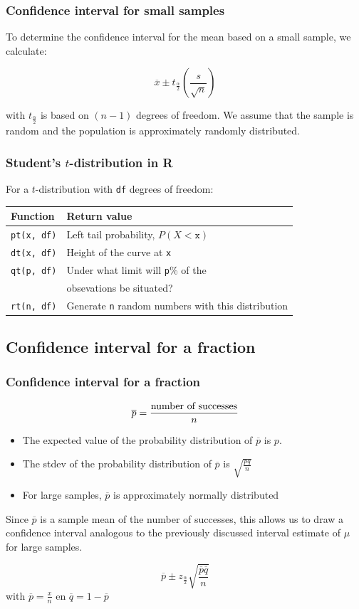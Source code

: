 \documentclass{beamer}
\begin{document}
\begin{frame}
  \frametitle{Confidence interval for small samples}

  To determine the confidence interval for the mean based on a small sample, we calculate:

  \[ \overline{x} \pm t_{\frac{\alpha}{2}}(\frac{s}{\sqrt{n}}) \]

  with $t_{\frac{\alpha}{2}}$ is based on $(n-1)$ degrees of freedom. We assume that the sample is random and the population is approximately randomly distributed.
\end{frame}


\begin{frame}[fragile]
\frametitle{Student's $t$-distribution in R}

For a $t$-distribution with \texttt{df} degrees of freedom:
\vfill
\centering
\begin{tabular}{ll}
	\textbf{Function} & \textbf{Return value}                                    \\ \hline
	\verb|pt(x, df)| & Left tail probability, $P(X<\mathtt{x})$                  \\
	\verb|dt(x, df)| & Height of the curve at \texttt{x}                     \\
	\verb|qt(p, df)| & Under what limit will \texttt{p}\% of the     \\
	                 & obsevations be situated?                             \\
	\verb|rt(n, df)| & Generate \texttt{n} random numbers with this distribution
\end{tabular}

\end{frame}

\subsection{Confidence interval for a fraction}
\begin{frame}
  \frametitle{Confidence interval for a fraction}
  \[ \overline{p} = \frac{\textnormal{number of successes}}{n} \]
  \begin{itemize}
  \item The expected value of the probability distribution of $\overline{p}$ is $p$.
  \item The stdev of the probability distribution of  $\overline{p}$ is $\sqrt{\frac{pq}{n}}$
  \item For large samples, $\overline{p}$ is approximately normally distributed
\end{itemize}

Since $\overline{p}$ is a sample mean of the number of successes, this allows us to draw a confidence interval analogous to the previously discussed interval estimate of $\mu$ for large samples.

  \[ \overline{p} \pm z_{\frac{\alpha}{2}} \sqrt{\frac{\overline{p}\overline{q}}{n}} \]
  with $\overline{p} = \frac{x}{n}$ en $\overline{q} = 1- \overline{p}$

\end{frame}
\end{document}
